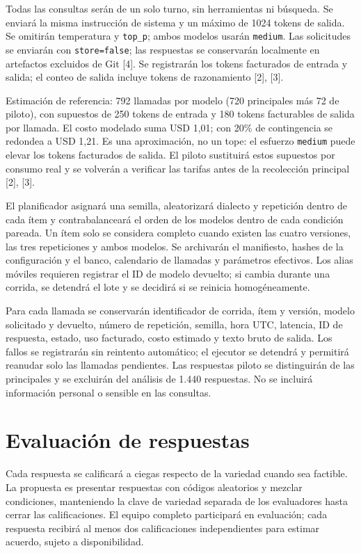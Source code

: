 \documentclass[conference]{IEEEtran}
\begin{document}
Todas las consultas serán de un solo turno, sin herramientas ni búsqueda. Se enviará la misma instrucción de sistema y un máximo de 1024 tokens de salida. Se omitirán temperatura y \texttt{top\_p}; ambos modelos usarán \texttt{medium}. Las solicitudes se enviarán con \texttt{store=false}; las respuestas se conservarán localmente en artefactos excluidos de Git [4]. Se registrarán los tokens facturados de entrada y salida; el conteo de salida incluye tokens de razonamiento [2], [3].

Estimación de referencia: 792 llamadas por modelo (720 principales más 72 de piloto), con supuestos de 250 tokens de entrada y 180 tokens facturables de salida por llamada. El costo modelado suma USD 1,01; con 20\% de contingencia se redondea a USD 1,21. Es una aproximación, no un tope: el esfuerzo \texttt{medium} puede elevar los tokens facturados de salida. El piloto sustituirá estos supuestos por consumo real y se volverán a verificar las tarifas antes de la recolección principal [2], [3].

El planificador asignará una semilla, aleatorizará dialecto y repetición dentro de cada ítem y contrabalanceará el orden de los modelos dentro de cada condición pareada. Un ítem solo se considera completo cuando existen las cuatro versiones, las tres repeticiones y ambos modelos. Se archivarán el manifiesto, hashes de la configuración y el banco, calendario de llamadas y parámetros efectivos. Los alias móviles requieren registrar el ID de modelo devuelto; si cambia durante una corrida, se detendrá el lote y se decidirá si se reinicia homogéneamente.

Para cada llamada se conservarán identificador de corrida, ítem y versión, modelo solicitado y devuelto, número de repetición, semilla, hora UTC, latencia, ID de respuesta, estado, uso facturado, costo estimado y texto bruto de salida. Los fallos se registrarán sin reintento automático; el ejecutor se detendrá y permitirá reanudar solo las llamadas pendientes. Las respuestas piloto se distinguirán de las principales y se excluirán del análisis de 1.440 respuestas. No se incluirá información personal o sensible en las consultas.

\section{Evaluación de respuestas}
Cada respuesta se calificará a ciegas respecto de la variedad cuando sea factible. La propuesta es presentar respuestas con códigos aleatorios y mezclar condiciones, manteniendo la clave de variedad separada de los evaluadores hasta cerrar las calificaciones. El equipo completo participará en evaluación; cada respuesta recibirá al menos dos calificaciones independientes para estimar acuerdo, sujeto a disponibilidad.
\end{document}
